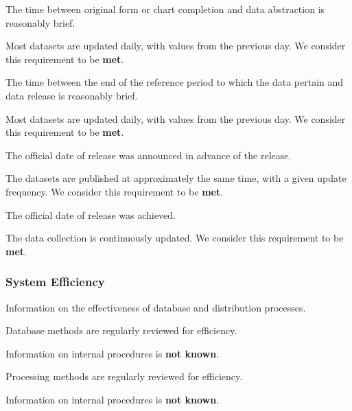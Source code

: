 \begin{QandA}
    \item The time between original form or chart completion and data abstraction is reasonably brief.
    \begin{answered}
        Most datasets are updated daily, with values from the previous day.
        We consider this requirement to be \textbf{met}.
    \end{answered}

    \item The time between the end of the reference period to which the data pertain and data release is reasonably brief.
    \begin{answered}
        Most datasets are updated daily, with values from the previous day.
        We consider this requirement to be \textbf{met}.
    \end{answered}

    \item The official date of release was announced in advance of the release.
    \begin{answered}
        The datasets are published at approximately the same time, with a given update frequency.
        We consider this requirement to be \textbf{met}.
    \end{answered}

    \item The official date of release was achieved.
    \begin{answered}
        The data collection is continuously updated.
        We consider this requirement to be \textbf{met}.
    \end{answered}

\end{QandA}

\subsubsection{System Efficiency}

Information on the effectiveness of database and distribution processes.

\begin{QandA}
    \item Database methods are regularly reviewed for efficiency.
    \begin{answered}
        Information on internal procedures is \textbf{not known}.
    \end{answered}

    \item Processing methods are regularly reviewed for efficiency.
    \begin{answered}
        Information on internal procedures is \textbf{not known}.
    \end{answered}

\end{QandA}

